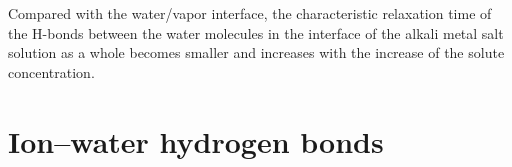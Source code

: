 Compared with the water/vapor interface, the characteristic relaxation time of the H-bonds between the water molecules 
in the interface of the alkali metal salt solution as a whole becomes smaller and increases with the increase of the solute concentration.
\section{Ion--water hydrogen bonds}\label{PARA_ION-WAT}

